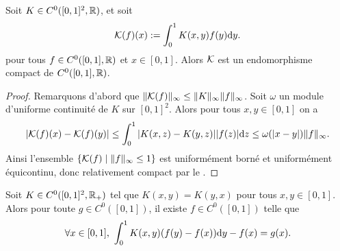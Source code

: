 \begin{lemma}
\label{lem:convK_compact}
	Soit $K \in C^0([0,1]^2,\mathbb{R})$, et soit 
	\begin{equation*}
		\mathcal{K}(f)(x) := \int_0^1 K(x,y) f(y) \mathrm{d} y.
	\end{equation*}
	pour tous $f \in C^0([0,1],\mathbb{R})$ et $x \in [0,1]$. 
	Alors $\mathcal{K}$ est un endomorphisme compact de $C^0([0,1],\mathbb{R})$. 
\end{lemma}

\begin{proof}
	Remarquons d'abord que $\|\mathcal{K}(f)\|_\infty \leq \|K\|_\infty \|f\|_\infty$. 
	Soit $\omega$ un module d'uniforme continuité de $K$ sur $[0,1]^2$. Alors pour tous $x,y \in [0,1]$ on a 
	\begin{equation*}
		|\mathcal{K}(f)(x)-\mathcal{K}(f)(y)| 
		\leq \int_0^1 |K(x,z)-K(y,z)| |f(z)| \mathrm{d} z \leq \omega(|x-y|) \|f\|_\infty.
	\end{equation*}
	Ainsi l'ensemble $\{\mathcal{K}(f) \mid \|f\|_\infty \leq 1\}$ est uniformément borné et uniformément équicontinu, donc relativement compact par le .
\end{proof}

\begin{corollary}
\label{corol:eqFuncNoyau}
	Soit $K \in C^0([0,1]^2,\mathbb{R}_+)$ tel que $K(x,y) = K(y,x)$ pour tous $x,y \in [0,1]$. Alors pour toute $g \in C^0([0,1])$, il existe $f \in C^0([0,1])$ telle que 
	\begin{equation*}
		\forall x \in [0,1],\ \int_0^1 K(x,y) (f(y)-f(x)) \mathrm{d} y - f(x) = g(x). 
	\end{equation*}
\end{corollary}

